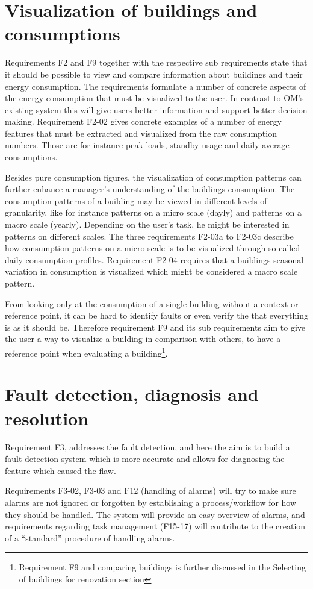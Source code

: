 \section{Visualization of buildings and consumptions}
Requirements F2 and F9 together with the respective sub requirements state that it should be possible to view and compare information about buildings and their energy consumption. The requirements formulate a number of concrete aspects of the energy consumption that must be visualized to the user. In contrast to OM’s existing system this will give users better information and support better decision making. Requirement F2-02 gives concrete examples of a number of energy features that must be extracted and visualized from the raw consumption numbers. Those are for instance peak loads, standby usage and daily average consumptions.

Besides pure consumption figures, the visualization of consumption patterns can further enhance a manager's understanding of the buildings consumption. The consumption patterns of a building may be viewed in different levels of granularity, like for instance patterns on a micro scale (dayly) and patterns on a macro scale (yearly). Depending on the user’s task, he might be interested in patterns on different scales. The three requirements F2-03a to F2-03c  describe how consumption patterns on a micro scale is to be visualized through so called daily consumption profiles. Requirement F2-04 requires that a buildings seasonal variation in consumption is visualized which might be considered a macro scale pattern. 

From looking only at the consumption of a single building without a context or reference point, it can be hard to identify faults or even verify the that everything is as it should be. Therefore requirement F9 and its sub requirements aim to give the user a way to visualize a building in comparison with others, to have a reference point when evaluating a building\footnote{Requirement F9 and comparing buildings is further discussed in the Selecting of buildings for renovation section}. 
\section{Fault detection, diagnosis and resolution}
Requirement F3, addresses the fault detection, and here the aim is to build a fault detection system which is more accurate and allows for diagnosing the feature which caused the flaw. 

Requirements F3-02, F3-03 and F12 (handling of alarms) will try to make sure alarms are not ignored or forgotten by establishing a process/workflow for how they should be handled. The system will provide an easy overview of alarms, and requirements regarding task management (F15-17) will contribute to the creation of a “standard” procedure of handling alarms.
